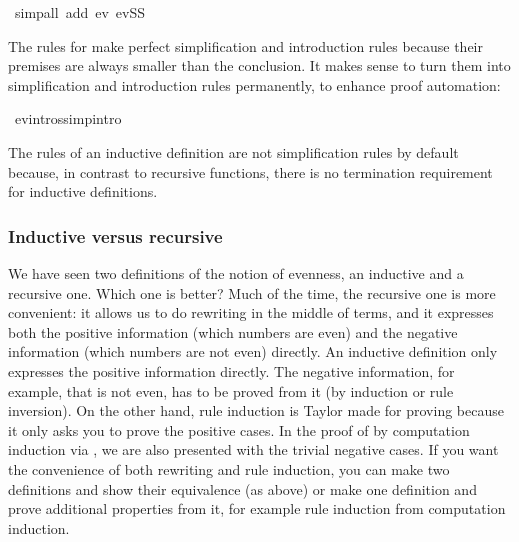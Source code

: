 \begin{isabellebody}
\ {}simp{}all\ add{}\ ev{}\ evSS{}%
\endisatagproof
{\isafoldproof}%
%
\isadelimproof
%
\endisadelimproof
%
\begin{isamarkuptext}%
The rules for  make perfect simplification and introduction
rules because their premises are always smaller than the conclusion. It
makes sense to turn them into simplification and introduction rules
permanently, to enhance proof automation:%
\end{isamarkuptext}%
\isamarkuptrue%
\isamarkupfalse%
\ ev{}intros{}simp{}intro{}%
\begin{isamarkuptext}%
The rules of an inductive definition are not simplification rules by
default because, in contrast to recursive functions, there is no termination
requirement for inductive definitions.

\subsubsection{Inductive versus recursive}

We have seen two definitions of the notion of evenness, an inductive and a
recursive one. Which one is better? Much of the time, the recursive one is
more convenient: it allows us to do rewriting in the middle of terms, and it
expresses both the positive information (which numbers are even) and the
negative information (which numbers are not even) directly. An inductive
definition only expresses the positive information directly. The negative
information, for example, that  is not even, has to be proved from
it (by induction or rule inversion). On the other hand, rule induction is
Taylor made for proving \mbox{} because it only asks you
to prove the positive cases. In the proof of  by
computation induction via , we are also presented
with the trivial negative cases. If you want the convenience of both
rewriting and rule induction, you can make two definitions and show their
equivalence (as above) or make one definition and prove additional properties
from it, for example rule induction from computation induction.


\end{isamarkuptext}
\end{isabellebody}
